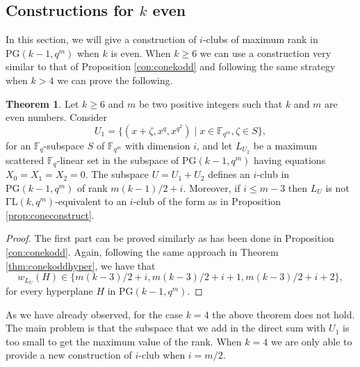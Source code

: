 \documentclass[11pt]{amsart}
\theoremstyle{definition}
\newtheorem{theorem}{Theorem}[section]
\newcommand{\fq}{{\mathbb F}_{q}}
\newcommand{\fqm}{\mathbb{F}_{q^m}}
\begin{document}
\subsection{Constructions for $k$ even}
In this section, we will give a construction of $i$-clubs of maximum rank in $\mathrm{PG}(k-1,q^m)$ when $k$ is even. 
When $k\geq 6$ we can use a construction very similar to that of Proposition \ref{con:conekodd} and following the same strategy when $k>4$ we can prove the following.

\begin{theorem} \label{th:inequivalencekeven}
Let $k \geq 6$ and $m$ be two positive integers such that $k$ and $m$ are even numbers.
    Consider
    \[ U_1=\{(x+\zeta,x^q,x^{q^2})\mid x\in \mathbb{F}_{q^m}, \zeta\in S\}, \]
    for an $\fq$-subspace $S$ of $\fqm$ with dimension $i$, and let $L_{U_2}$ be a maximum scattered $\fq$-linear set in the subspace of $\mathrm{PG}(k-1,q^m)$ having equations $X_0=X_1=X_2=0$.
    The subspace $U=U_1+U_2$ defines an $i$-club in $\mathrm{PG}(k-1,q^m)$ of rank $m(k-1)/2+i$.
    Moreover, if $i\leq m-3$ then $L_U$ is not $\mathrm{\Gamma L}(k,q^m)$-equivalent to an $i$-club of the form as in Proposition \ref{prop:coneconstruct}.
\end{theorem}
\begin{proof}
    The first part can be proved similarly as has been done in Proposition \ref{con:conekodd}.
    Again, following the same approach in Theorem \ref{thm:conekoddhyper}, we have that
    \[ w_{L_U}(H) \in \{m(k-3)/2+i,m(k-3)/2+i+1,m(k-3)/2+i+2\}, \]
    for every hyperplane $H$ in $\mathrm{PG}(k-1,q^m)$.
\end{proof}

As we have already observed, for the case $k=4$ the above theorem does not hold. The main problem is that the subspace that we add in the direct sum with $U_1$ is too small to get the maximum value of the rank. When $k=4$ we are only able to provide a new construction of $i$-club when $i=m/2$.
\end{document}
